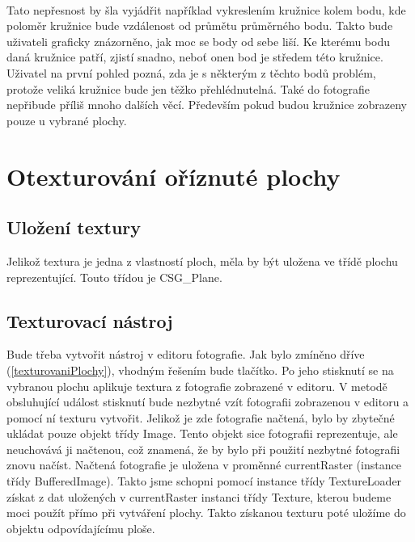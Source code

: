 \documentclass[11pt,twoside,a4paper]{book}
\begin{document}
\paragraph{}
Tato nepřesnost by šla vyjádřit například vykreslením kružnice kolem bodu, kde poloměr kružnice bude vzdálenost od průmětu průměrného bodu. Takto bude uživateli graficky znázorněno, jak moc se body od sebe liší. Ke kterému bodu daná kružnice patří, zjistí snadno, neboť onen bod je středem této kružnice.  Uživatel na první pohled pozná, zda je s některým z těchto bodů problém, protože veliká kružnice bude jen těžko přehlédnutelná. Také do fotografie nepřibude příliš mnoho dalších věcí. Především pokud budou kružnice zobrazeny pouze u vybrané plochy.

\section{Otexturování oříznuté plochy}

\subsection{Uložení textury}
Jelikož textura je jedna z vlastností ploch, měla by být uložena ve třídě plochu reprezentující. Touto třídou je CSG\_Plane.  

\subsection{Texturovací nástroj}
Bude třeba vytvořit nástroj v editoru fotografie. Jak bylo zmíněno dříve (\ref{texturovaniPlochy}), vhodným řešením bude tlačítko. Po jeho stisknutí se na vybranou plochu aplikuje textura z fotografie zobrazené v editoru. V metodě obsluhující událost stisknutí bude nezbytné vzít fotografii zobrazenou v editoru a pomocí ní texturu vytvořit. Jelikož je zde fotografie načtená, bylo by zbytečné ukládat pouze objekt třídy Image. Tento objekt sice fotografii reprezentuje, ale neuchovává ji načtenou, což znamená, že by bylo při použití nezbytné fotografii znovu načíst. Načtená fotografie je uložena v proměnné currentRaster (instance třídy BufferedImage). Takto jsme schopni pomocí instance třídy TextureLoader získat z dat uložených v currentRaster instanci třídy Texture, kterou budeme moci použít přímo při vytváření plochy. Takto získanou texturu poté uložíme do objektu odpovídajícímu ploše.
\end{document}
